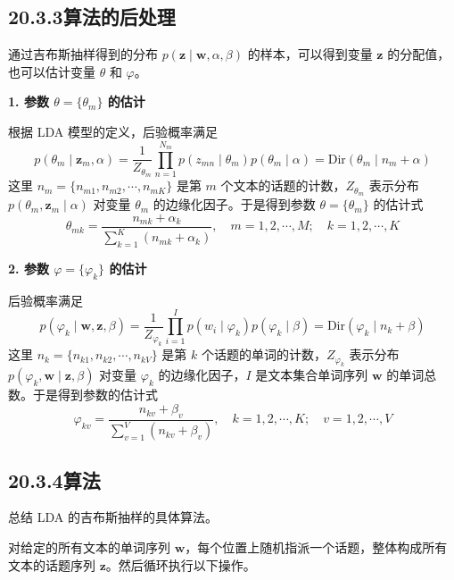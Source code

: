 \documentclass[UTF8, 12pt, fontset=fandol, oneside]{ctexart}
\begin{document}
\subsection*{20.3.3\quad 算法的后处理}

通过吉布斯抽样得到的分布 $p(\mathbf{z}\mid\mathbf{w},\alpha,\beta)$ 的样本，可以得到变量 $\mathbf{z}$ 的分配值，也可以估计变量 $\theta$ 和 $\varphi$。

\noindent\textbf{1. 参数 $\theta=\{\theta_m\}$ 的估计}

根据 LDA 模型的定义，后验概率满足
\begin{equation}
p(\theta_m\mid\mathbf{z}_m,\alpha)=\frac{1}{Z_{\theta_m}}\prod_{n=1}^{N_m}p(z_{mn}\mid\theta_m)p(\theta_m\mid\alpha)=\mathrm{Dir}(\theta_m\mid n_m+\alpha)
\tag{20.30}
\end{equation}
这里 $n_m=\{n_{m1},n_{m2},\cdots,n_{mK}\}$ 是第 $m$ 个文本的话题的计数，$Z_{\theta_m}$ 表示分布 $p(\theta_m,\mathbf{z}_m\mid\alpha)$ 对变量 $\theta_m$ 的边缘化因子。于是得到参数 $\theta=\{\theta_m\}$ 的估计式
\begin{equation}
\theta_{mk}=\frac{n_{mk}+\alpha_k}{\sum_{k=1}^K(n_{mk}+\alpha_k)},\quad m=1,2,\cdots,M;\quad k=1,2,\cdots,K
\tag{20.31}
\end{equation}

\noindent\textbf{2. 参数 $\varphi=\{\varphi_k\}$ 的估计}

后验概率满足
\begin{equation}
p(\varphi_k\mid\mathbf{w},\mathbf{z},\beta)=\frac{1}{Z_{\varphi_k}}\prod_{i=1}^I p(w_i\mid\varphi_k)p(\varphi_k\mid\beta)=\mathrm{Dir}(\varphi_k\mid n_k+\beta)
\tag{20.32}
\end{equation}
这里 $n_k=\{n_{k1},n_{k2},\cdots,n_{kV}\}$ 是第 $k$ 个话题的单词的计数，$Z_{\varphi_k}$ 表示分布 $p(\varphi_k,\mathbf{w}\mid\mathbf{z},\beta)$ 对变量 $\varphi_k$ 的边缘化因子，$I$ 是文本集合单词序列 $\mathbf{w}$ 的单词总数。于是得到参数的估计式
\begin{equation}
\varphi_{kv}=\frac{n_{kv}+\beta_v}{\sum_{v=1}^V(n_{kv}+\beta_v)},\quad k=1,2,\cdots,K;\quad v=1,2,\cdots,V
\tag{20.33}
\end{equation}

\subsection*{20.3.4\quad 算法}

总结 LDA 的吉布斯抽样的具体算法。

对给定的所有文本的单词序列 $\mathbf{w}$，每个位置上随机指派一个话题，整体构成所有文本的话题序列 $\mathbf{z}$。然后循环执行以下操作。
\end{document}
